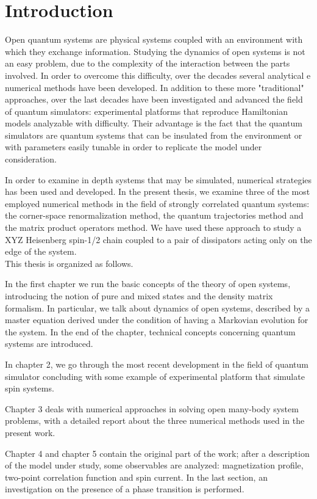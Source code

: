 \chapter*{Introduction}

\label{Introduction}

Open quantum systems are physical systems coupled with an environment with which they exchange information. Studying the dynamics of open systems is not an easy problem, due to the complexity of the interaction between the parts involved. In order to overcome this difficulty, over the decades several analytical e numerical methods have been developed. In addition to these more "traditional" approaches, over the last decades have been investigated and advanced the field of quantum simulators: experimental platforms that reproduce Hamiltonian models analyzable with difficulty. Their advantage is the fact that the quantum simulators are quantum systems that can be insulated from the environment or with parameters easily tunable in order to replicate the model under consideration.

In order to examine in depth systems that may be simulated, numerical strategies has been used and developed. In the present thesis, we examine three of the most employed numerical methods in the field of strongly correlated quantum systems: the corner-space renormalization method, the quantum trajectories method and the matrix product operators method. We have used these approach to study a XYZ Heisenberg spin-1/2 chain coupled to a pair of dissipators acting only on the edge of the system. 
\\


This thesis is organized as follows. 

In the first chapter we run the basic concepts of the theory of open systems, introducing the notion of pure and mixed states and the density matrix formalism. In particular, we talk about dynamics of open systems, described by a master equation derived under the condition of having a Markovian evolution for the system. In the end of the chapter, technical concepts concerning quantum systems are introduced. 

In chapter 2, we go through the most recent development in the field of quantum simulator concluding with some example of experimental platform that simulate spin systems. 

Chapter 3 deals with numerical approaches in solving open many-body system problems, with a detailed report about the three numerical methods used in the present work. 

Chapter 4 and chapter 5 contain the original part of the work; after a description of the model under study, some observables are analyzed: magnetization profile, two-point correlation function and spin current. In the last section, an investigation on the presence of a phase transition is performed.